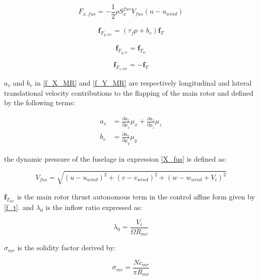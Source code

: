 \begin{equation}
	F_{x,fus}=-\frac{1}{2} \rho S_x^{fus} V_{fus} (u-u_{wind})
	\label{X_fus}
\end{equation}

\begin{gather}\label{f_Y_MR}
	\textbf{f}_{F_{y,mr}}=(\tau_fp+b_v)\textbf{f}_T
\end{gather}

\begin{equation}
	\textbf{f}_{F_{y,tr}}=\textbf{f}_{T_{tr}} 
\end{equation}



\begin{equation}
	\textbf{f}_{F_{z,mr}}=-\textbf{f}_T    
\end{equation}


$a_v$ and $b_v$ in \ref{f_X_MR} and \ref{f_Y_MR} are respectively longitudinal and lateral translational velocity contributions to the flapping of the main rotor  and defined by the following terms:

\begin{equation}
	\begin{aligned}
		a_v&=\frac{\partial a_1}{\partial \mu_x} \mu_x+\frac{\partial a_1}{\partial \mu_z} \mu_z \\
		b_v&=\frac{\partial a_1}{\partial \mu_y}\mu_y 
	\end{aligned}
\end{equation}

the dynamic pressure of the fuselage in expression \ref{X_fus} is defined as:

\begin{equation}
	V_{fus}=\sqrt{(u-u_{wind})^2+(v-v_{wind})^2+(w-w_{wind}+V_i)^2}
\end{equation}



$\textbf{f}_{T_{mr}}$ is the main rotor thrust autonomous term in the control affine form given by \ref{f_t}.
and $\lambda_0$ is the inflow ratio expressed as:

\begin{equation}
	\lambda_0=\frac{V_i}{\Omega R_{mr}}
\end{equation}

$\sigma_{mr}$ is the solidity factor derived by:

\begin{equation}
	\sigma_{mr}=\frac{Nc_{mr}}{\pi R_{mr}}
\end{equation}

